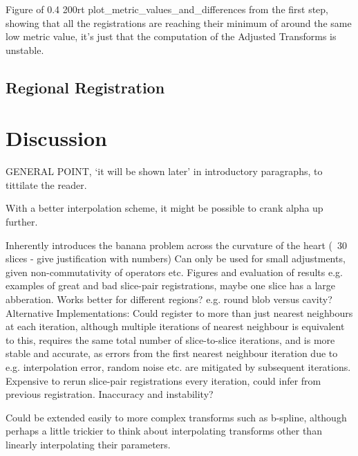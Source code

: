   Figure of 0.4 200rt plot\_metric\_values\_and\_differences from the first step, showing that all the registrations are reaching their minimum of around the same low metric value, it's just that the computation of the Adjusted Transforms is unstable.
  
  
  
  
  \subsection{Regional Registration} %
  \label{sub:regional_registration}
  


\section{Discussion} %
\label{sec:discussion}
  GENERAL POINT, `it will be shown later' in introductory paragraphs, to tittilate the reader.

  With a better interpolation scheme, it might be possible to crank alpha up further.
  
  Inherently introduces the banana problem across the curvature of the heart (~30 slices - give justification with numbers)
  Can only be used for small adjustments, given non-commutativity of operators etc.
  Figures and evaluation of results e.g. examples of great and bad slice-pair registrations, maybe one slice has a large abberation. Works better for different regions? e.g. round blob versus cavity?
  Alternative Implementations:
  Could register to more than just nearest neighbours at each iteration, although multiple iterations of nearest neighbour is equivalent to this, requires the same total number of slice-to-slice iterations, and is more stable and accurate, as errors from the first nearest neighbour iteration due to e.g. interpolation error, random noise etc. are mitigated by subsequent iterations.
  Expensive to rerun slice-pair registrations every iteration, could infer from previous registration. Inaccuracy and instability?
  
  Could be extended easily to more complex transforms such as b-spline, although perhaps a little trickier to think about interpolating transforms other than linearly interpolating their parameters.



  

